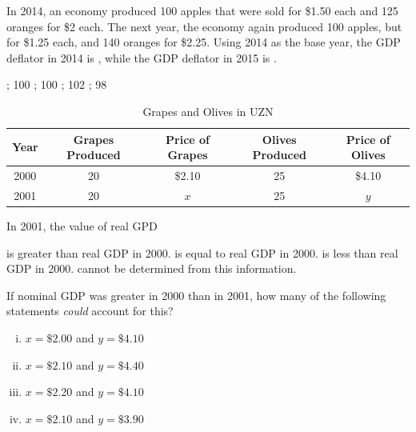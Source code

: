 \documentclass[addpoints,11pt]{exam}
\theoremstyle{definition}
\newcommand{\blank}[0]{\underline{\hspace{3cm}}}
\begin{document}
\begin{questions}
\newpage

	\question In 2014, an economy produced 100 apples that were sold for \$1.50 each and 125 oranges for \$2 each. The next year, the economy again produced 100 apples, but for \$1.25 each, and 140 oranges for \$2.25. Using 2014 as the base year, the GDP deflator in 2014 is \blank, while the GDP deflator in 2015 is \blank.

\begin{choices}
	; 100
	; 100
	; 102
	; 98
\end{choices}
	


\begin{table}[H]
	\caption{Grapes and Olives in UZN}
	\centering
	\begin{tabular}{c|c|c|c|c}
		Year & Grapes Produced & Price of Grapes & Olives Produced & Price of Olives \\
		\hline
		2000 & 20 & \$2.10 & 25 & \$4.10\\
		2001 & 20 & $x$ & 25 & $y$\\
	\end{tabular} 
	\label{MC23}
\end{table}

\question \label{q16} In 2001, the value of real GPD 

\begin{choices}
	 \choice is greater than real GDP in 2000.
	 \CorrectChoice is equal to real GDP in 2000.
	 \choice is less than real GDP in 2000.
	 \choice cannot be determined from this information.
\end{choices}


\question \label{q17} If nominal GDP was greater in 2000 than in 2001, how many of the following statements \textit{could} account for this?


\begin{enumerate}[(i)]
	\item $x = \$2.00$ and $y = \$4.10$
	\item $x = \$2.10$ and $y = \$4.40$
	\item  $x = \$2.20$ and $y = \$4.10$
	\item $x = \$2.10$ and $y = \$3.90$
\end{enumerate}


\end{questions}
\end{document}
